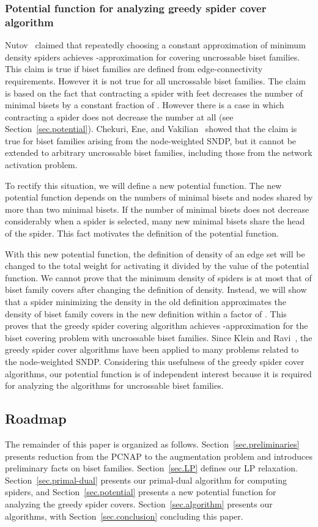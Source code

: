 \documentclass[11pt]{article}
\begin{document}
\subsubsection*{Potential function for analyzing greedy spider cover algorithm}
Nutov~\cite{Nutov12uncrossable} claimed that
repeatedly choosing a constant approximation of minimum density spiders
achieves 
-approximation for covering uncrossable biset families.
This claim is true if biset families are defined from
edge-connectivity requirements.
However it is not true for all uncrossable biset families.
The claim is based on the fact that contracting a spider with  feet
decreases the number of minimal bisets by a constant fraction of .
However there is a case in which contracting a spider does not decrease
the number at all (see Section~\ref{sec.potential}).
Chekuri, Ene, and Vakilian~\cite{Vakilian13}
showed that the claim is true for biset families arising from the
node-weighted SNDP,
but it cannot be extended to arbitrary uncrossable biset families,
including those from the network activation problem.

To rectify this situation,
we will define a new potential function.
The new potential function depends on
the numbers of minimal bisets and
 nodes shared by more
than two minimal bisets.
If the number of minimal bisets does not decrease considerably when a
spider is selected, 
many new minimal bisets share the head of the spider.
This fact motivates the definition of the potential function.

With this new potential function,
the definition of density of an edge set will be changed to the total weight for
activating it divided by the value of the potential function.
We cannot prove that the minimum density of spiders is at most that of
biset family covers after changing the definition of density.
Instead, we will show that a spider minimizing the density in the old definition
approximates 
the density of biset family covers in the new definition within a factor of .
This proves that the greedy spider covering algorithm achieves
 -approximation for the biset
covering problem with uncrossable biset families.
Since Klein and Ravi~\cite{KleinR95},
the greedy spider cover algorithms have been applied to many problems
related to the node-weighted SNDP.
Considering this usefulness of the greedy spider cover algorithms,
our potential function is of independent interest
because it is required for analyzing the algorithms for
uncrossable biset families.

\subsection{Roadmap}
The remainder of this paper is organized as follows. 
Section~\ref{sec.preliminaries}
presents reduction from the PCNAP to the
augmentation problem
and introduces preliminary facts on biset families. 
Section~\ref{sec.LP}
defines our LP relaxation.
Section~\ref{sec.primal-dual} presents our primal-dual algorithm for
computing spiders, and Section~\ref{sec.potential}
presents a new potential function for analyzing the greedy spider covers.
Section~\ref{sec.algorithm} presents our algorithms, with
Section~\ref{sec.conclusion}
concluding this paper.
\end{document}
